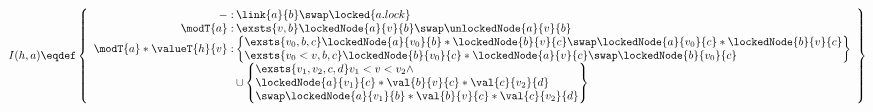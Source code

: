 %
%
\[
	I(h, a) \eqdef 
	\left\{
	\begin{array}{r @ {\hspace*{2pt}}l}
		- : & \link{a}{b} \swap \locked{a.lock}\\
		
		\modT{a} : & \exsts{v, b} \lockedNode{a}{v}{b} \swap \unlockedNode{a}{v}{b}\\
		
%
		
		\modT{a} * \valueT{h}{v}: &
		\left\{
		\begin{array}{@{} l @{}}
			\exsts{v_0, b, c} \lockedNode{a}{v_0}{b} * \lockedNode{b}{v}{c} \swap \lockedNode{a}{v_0}{c} * \lockedNode{b}{v}{c}\\
			\exsts{v_0 < v, b, c} \lockedNode{b}{v_0}{c} * \lockedNode{a}{v}{c} \swap \lockedNode{b}{v_0}{c}
			
		\end{array}
		\right\}\\
		
		&\cup 
		\left\{
		\begin{array}{@{} l @{}}
			 \exsts{v_1, v_2, c, d} v_1 < v < v_2 \land\\
			 \lockedNode{a}{v_1}{c} * \val{b}{v}{c} * \val{c}{v_2}{d} \\
	  		\swap \lockedNode{a}{v_1}{b} * \val{b}{v}{c} *  \val{c}{v_2}{d}		
		\end{array}
		\right\}\\ 
		
		
		
		
		

%		
%			 
%						
		
	\end{array}
	\right\}
\]
